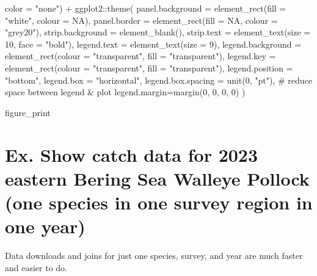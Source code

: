 \documentclass[
  letterpaper,
  oneside,
  open=any]{scrbook}
\newenvironment{Shaded}{\begin{snugshade}}{\end{snugshade}}
\newcommand{\AttributeTok}[1]{\textcolor[rgb]{0.40,0.45,0.13}{#1}}
\newcommand{\CommentTok}[1]{\textcolor[rgb]{0.37,0.37,0.37}{#1}}
\newcommand{\ConstantTok}[1]{\textcolor[rgb]{0.56,0.35,0.01}{#1}}
\newcommand{\DecValTok}[1]{\textcolor[rgb]{0.68,0.00,0.00}{#1}}
\newcommand{\FunctionTok}[1]{\textcolor[rgb]{0.28,0.35,0.67}{#1}}
\newcommand{\NormalTok}[1]{\textcolor[rgb]{0.00,0.23,0.31}{#1}}
\newcommand{\SpecialCharTok}[1]{\textcolor[rgb]{0.37,0.37,0.37}{#1}}
\newcommand{\StringTok}[1]{\textcolor[rgb]{0.13,0.47,0.30}{#1}}
\begin{document}
\begin{Shaded}
\begin{Highlighting}[]
    \AttributeTok{color =} \StringTok{"none"}\NormalTok{) }\SpecialCharTok{+}
\NormalTok{  ggplot2}\SpecialCharTok{::}\FunctionTok{theme}\NormalTok{( }
    \AttributeTok{panel.background =} \FunctionTok{element\_rect}\NormalTok{(}\AttributeTok{fill =} \StringTok{"white"}\NormalTok{, }\AttributeTok{colour =} \ConstantTok{NA}\NormalTok{), }
    \AttributeTok{panel.border =} \FunctionTok{element\_rect}\NormalTok{(}\AttributeTok{fill =} \ConstantTok{NA}\NormalTok{, }\AttributeTok{colour =} \StringTok{"grey20"}\NormalTok{), }
    \AttributeTok{strip.background =} \FunctionTok{element\_blank}\NormalTok{(), }
    \AttributeTok{strip.text =} \FunctionTok{element\_text}\NormalTok{(}\AttributeTok{size =} \DecValTok{10}\NormalTok{, }\AttributeTok{face =} \StringTok{"bold"}\NormalTok{), }
    \AttributeTok{legend.text =} \FunctionTok{element\_text}\NormalTok{(}\AttributeTok{size =} \DecValTok{9}\NormalTok{),}
    \AttributeTok{legend.background =} \FunctionTok{element\_rect}\NormalTok{(}\AttributeTok{colour =} \StringTok{"transparent"}\NormalTok{, }
                                     \AttributeTok{fill =} \StringTok{"transparent"}\NormalTok{),}
    \AttributeTok{legend.key =} \FunctionTok{element\_rect}\NormalTok{(}\AttributeTok{colour =} \StringTok{"transparent"}\NormalTok{, }
                              \AttributeTok{fill =} \StringTok{"transparent"}\NormalTok{),}
    \AttributeTok{legend.position =} \StringTok{"bottom"}\NormalTok{, }
    \AttributeTok{legend.box =} \StringTok{"horizontal"}\NormalTok{,}
    \AttributeTok{legend.box.spacing =} \FunctionTok{unit}\NormalTok{(}\DecValTok{0}\NormalTok{, }\StringTok{"pt"}\NormalTok{), }\CommentTok{\# reduce space between legend \& plot}
    \AttributeTok{legend.margin=}\FunctionTok{margin}\NormalTok{(}\DecValTok{0}\NormalTok{, }\DecValTok{0}\NormalTok{, }\DecValTok{0}\NormalTok{, }\DecValTok{0}\NormalTok{) )}

\NormalTok{figure\_print}
\end{Highlighting}
\end{Shaded}

\section{Ex. Show catch data for 2023 eastern Bering Sea Walleye Pollock
(one species in one survey region in one
year)}\label{ex.-show-catch-data-for-2023-eastern-bering-sea-walleye-pollock-one-species-in-one-survey-region-in-one-year}

Data downloads and joins for just one species, survey, and year are much
faster and easier to do.
\end{document}
